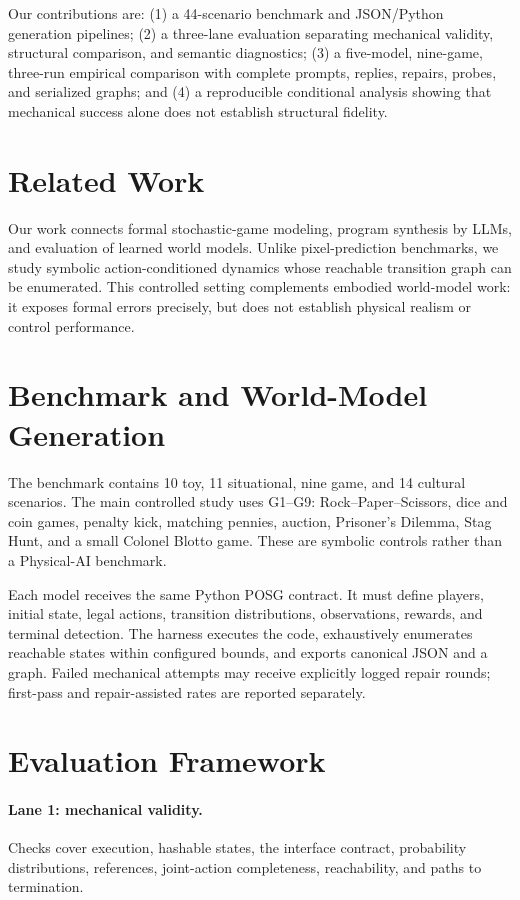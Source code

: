 \documentclass{article}
\begin{document}
Our contributions are: (1) a 44-scenario benchmark and JSON/Python generation
pipelines; (2) a three-lane evaluation separating mechanical validity,
structural comparison, and semantic diagnostics; (3) a five-model, nine-game,
three-run empirical comparison with complete prompts, replies, repairs, probes,
and serialized graphs; and (4) a reproducible conditional analysis showing
that mechanical success alone does not establish structural fidelity.

\section{Related Work}
Our work connects formal stochastic-game modeling, program synthesis by LLMs,
and evaluation of learned world models. Unlike pixel-prediction benchmarks, we
study symbolic action-conditioned dynamics whose reachable transition graph can
be enumerated. This controlled setting complements embodied world-model work:
it exposes formal errors precisely, but does not establish physical realism or
control performance.

\section{Benchmark and World-Model Generation}
The benchmark contains 10 toy, 11 situational, nine game, and 14 cultural
scenarios. The main controlled study uses G1--G9: Rock--Paper--Scissors, dice
and coin games, penalty kick, matching pennies, auction, Prisoner's Dilemma,
Stag Hunt, and a small Colonel Blotto game. These are symbolic controls rather
than a Physical-AI benchmark.

Each model receives the same Python POSG contract. It must define players,
initial state, legal actions, transition distributions, observations, rewards,
and terminal detection. The harness executes the code, exhaustively enumerates
reachable states within configured bounds, and exports canonical JSON and a
graph. Failed mechanical attempts may receive explicitly logged repair rounds;
first-pass and repair-assisted rates are reported separately.

\section{Evaluation Framework}
\paragraph{Lane 1: mechanical validity.}
Checks cover execution, hashable states, the interface contract, probability
distributions, references, joint-action completeness, reachability, and paths
to termination.
\end{document}
